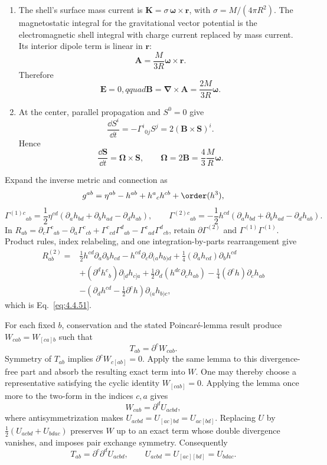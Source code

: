 \begin{enumerate}[leftmargin=2.8em,itemsep=1.2em]
\begin{enumerate}[label=\alph*),leftmargin=2em]
\item The shell's surface mass current is
\(\mathbf K=\sigma\,\boldsymbol\omega\mathbin\times\mathbf r\), with
\(\sigma=M/(4\pi R^2)\).  The magnetostatic integral for the gravitational
vector potential is the electromagnetic shell integral with charge current
replaced by mass current.  Its interior dipole term is linear in \(\mathbf r\):
\[
 \mathbf A=\frac{M}{3R}
 \boldsymbol\omega\mathbin\times\mathbf r.
\]
Therefore
\[
 \mathbf E=0,qquad
 \mathbf B=\boldsymbol\nabla\mathbin\times\mathbf A
 =\frac{2M}{3R}\boldsymbol\omega.
\]

\item At the center, parallel propagation and \(S^0=0\) give
\[
 \frac{\dd S^i}{\dd t}=-\Gamma^i{}_{0j}S^j
 =2(\mathbf B\mathbin\times\mathbf S)^i.
\]
Hence
\[
 \frac{\dd\mathbf S}{\dd t}=\boldsymbol\Omega\mathbin\times\mathbf S,
 \qquad
 \boldsymbol\Omega=2\mathbf B
 =\frac43\frac{M}{R}\boldsymbol\omega.
\]
\end{enumerate}

Expand the inverse metric and connection as
\[
 g^{ab}=\eta^{ab}-h^{ab}+h^a{}_ch^{cb}+\order(h^3),
\]
\[
 \Gamma^{(1)c}{}_{ab}
 =\frac12\eta^{cd}(\partial_ah_{bd}+\partial_bh_{ad}-\partial_dh_{ab}),
 \qquad
 \Gamma^{(2)c}{}_{ab}
 =-\frac12h^{cd}(\partial_ah_{bd}+\partial_bh_{ad}-\partial_dh_{ab}).
\]
In
\(R_{ab}=\partial_c\Gamma^c{}_{ab}-\partial_a\Gamma^c{}_{cb}
+\Gamma^c{}_{cd}\Gamma^d{}_{ab}-\Gamma^c{}_{ad}\Gamma^d{}_{cb}\),
retain \(\partial\Gamma^{(2)}\) and
\(\Gamma^{(1)}\Gamma^{(1)}\).  Product rules, index relabeling, and one
integration-by-parts rearrangement give
\[
\begin{aligned}
R^{(2)}_{ab}
={}&\frac12h^{cd}\partial_a\partial_bh_{cd}
-h^{cd}\partial_c\partial_{(a}h_{b)d}
+\frac14(\partial_ah_{cd})\partial_bh^{cd}\\
&+(\partial^dh^c{}_b)\partial_{[d}h_{c]a}
+\frac12\partial_d(h^{dc}\partial_ch_{ab})
-\frac14(\partial^ch)\partial_ch_{ab}\\
&-\left(\partial_dh^{cd}-\frac12\partial^ch\right)
\partial_{(a}h_{b)c},
\end{aligned}
\]
which is Eq.~\eqref{eq:4.4.51}.

For each fixed \(b\), conservation and the stated Poincar\'e-lemma result
produce \(W_{cab}=W_{[ca]b}\) such that
\[
 T_{ab}=\partial^cW_{cab}.
\]
Symmetry of \(T_{ab}\) implies \(\partial^cW_{c[ab]}=0\).  Apply the same
lemma to this divergence-free part and absorb the resulting exact term into
\(W\).  One may thereby choose a representative satisfying the cyclic
identity \(W_{[cab]}=0\).  Applying the lemma once more to the two-form in
the indices \(c,a\) gives
\[
 W_{cab}=\partial^dU_{acbd},
\]
where antisymmetrization makes
\(U_{acbd}=U_{[ac]bd}=U_{ac[bd]}\).  Replacing \(U\) by
\(\tfrac12(U_{acbd}+U_{bdac})\) preserves \(W\) up to an exact term whose
double divergence vanishes, and imposes pair exchange symmetry.  Consequently
\[
 T_{ab}=\partial^c\partial^dU_{acbd},
 \qquad U_{acbd}=U_{[ac][bd]}=U_{bdac}.
\]


\end{enumerate}
